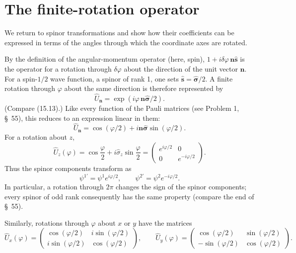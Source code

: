 \section{The finite-rotation operator}

We return to spinor transformations and show how their coefficients can be expressed in terms of the angles through which the coordinate axes are rotated.

By the definition of the angular-momentum operator (here, spin), $1+i\delta\varphi\,\mathbf n\hat{\mathbf s}$ is the operator for a rotation through $\delta\varphi$ about the direction of the unit vector $\mathbf n$. For a spin-$1/2$ wave function, a spinor of rank 1, one sets $\hat{\mathbf s}=\hat{\boldsymbol\sigma}/2$. A finite rotation through $\varphi$ about the same direction is therefore represented by
\begin{equation}
 \hat U_{\mathbf n}=\exp(i\varphi\,\mathbf n\hat{\boldsymbol\sigma}/2).
 \tag{58.1}
\end{equation}
(Compare (15.13).) Like every function of the Pauli matrices (see Problem 1, §~55), this reduces to an expression linear in them:
\begin{equation}
 \hat U_{\mathbf n}=\cos(\varphi/2)+i\mathbf n\hat{\boldsymbol\sigma}\sin(\varphi/2).
 \tag{58.2}
\end{equation}
For a rotation about $z$,
\begin{equation}
 \hat U_z(\varphi)=\cos\frac\varphi2+i\hat\sigma_z\sin\frac\varphi2
 =\begin{pmatrix}e^{i\varphi/2}&0\\0&e^{-i\varphi/2}\end{pmatrix}.
 \tag{58.3}
\end{equation}
Thus the spinor components transform as
\[
 \psi^{1'}=\psi^1e^{i\varphi/2},\qquad \psi^{2'}=\psi^2e^{-i\varphi/2}.
\]
In particular, a rotation through $2\pi$ changes the sign of the spinor components; every spinor of odd rank consequently has the same property (compare the end of §~55).

Similarly, rotations through $\varphi$ about $x$ or $y$ have the matrices
\begin{equation}
 \hat U_x(\varphi)=\begin{pmatrix}\cos(\varphi/2)&i\sin(\varphi/2)\\i\sin(\varphi/2)&\cos(\varphi/2)\end{pmatrix},\qquad
 \hat U_y(\varphi)=\begin{pmatrix}\cos(\varphi/2)&\sin(\varphi/2)\\-\sin(\varphi/2)&\cos(\varphi/2)\end{pmatrix}.
 \tag{58.4}
\end{equation}

